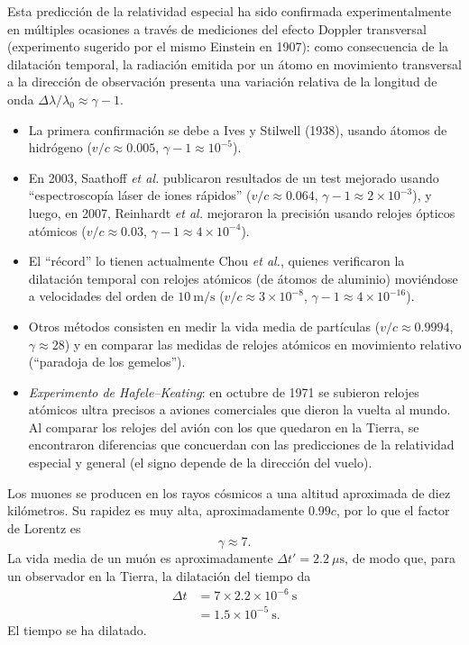 \begin{observacion}
Esta predicción de la relatividad especial ha sido confirmada
experimentalmente en múltiples ocasiones a través de mediciones del
efecto Doppler transversal (experimento sugerido por el mismo Einstein
en 1907): como consecuencia de la dilatación temporal, la radiación
emitida por un átomo en movimiento transversal a la dirección de
observación presenta una variación relativa de la longitud de onda
$\Delta\lambda/\lambda_0\approx\gamma-1$.
\begin{itemize}
\item La primera confirmación se debe a Ives y Stilwell (1938), usando
átomos de hidrógeno ($v/c\approx0.005$, $\gamma-1\approx10^{-5}$).
\item En 2003, Saathoff \emph{et al.} publicaron resultados de un test
mejorado usando ``espectroscopía láser de iones rápidos''
($v/c\approx0.064$, $\gamma-1\approx2\times10^{-3}$), y luego, en 2007,
Reinhardt \emph{et al.} mejoraron la precisión usando relojes ópticos
atómicos ($v/c\approx0.03$, $\gamma-1\approx4\times10^{-4}$).
\item El ``récord'' lo tienen actualmente Chou \emph{et al.}, quienes
verificaron la dilatación temporal con relojes atómicos (de átomos de
aluminio) moviéndose a velocidades del orden de $10\ \text{m/s}$
($v/c\approx3\times10^{-8}$, $\gamma-1\approx4\times10^{-16}$).
\item Otros métodos consisten en medir la vida media de partículas
($v/c\approx0.9994$, $\gamma\approx28$) y en comparar las medidas de
relojes atómicos en movimiento relativo (``paradoja de los gemelos'').
\item \emph{Experimento de Hafele--Keating}: en octubre de 1971 se
subieron relojes atómicos ultra precisos a aviones comerciales que dieron
la vuelta al mundo. Al comparar los relojes del avión con los que
quedaron en la Tierra, se encontraron diferencias que concuerdan con las
predicciones de la relatividad especial y general (el signo depende de
la dirección del vuelo).
\end{itemize}
\end{observacion}

\begin{ejemplo}
Los muones se producen en los rayos cósmicos a una altitud aproximada de
diez kilómetros. Su rapidez es muy alta, aproximadamente $0.99c$, por lo
que el factor de Lorentz es
\[
\gamma\approx7 . \tag{24}
\]
La vida media de un muón es aproximadamente $\Delta t'=2.2\ \mu\text{s}$,
de modo que, para un observador en la Tierra, la dilatación del tiempo
da
\begin{align*}
\Delta t &= 7\times2.2\times10^{-6}\ \text{s} \tag{25}\\
&= 1.5\times10^{-5}\ \text{s}. \tag{26}
\end{align*}
El tiempo se ha dilatado.
\end{ejemplo}

